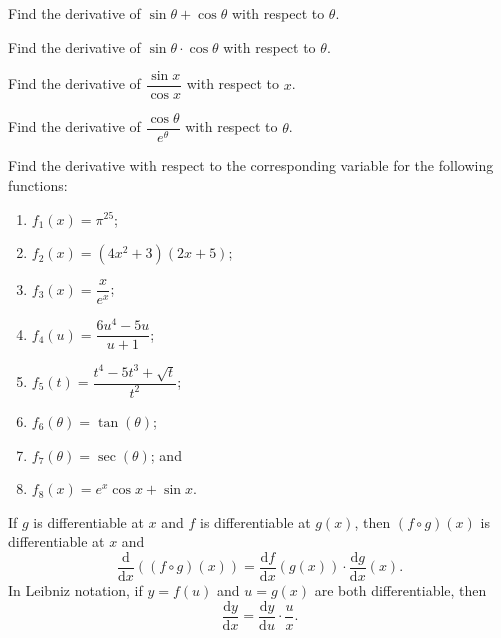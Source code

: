 \documentclass[11pt]{article}
\theoremstyle{break}
\newcommand{\differentiate}[1]{\dfrac{\dd}{\dd{#1}}}
\newcommand{\derivative}[2]{\dfrac{\dd{#1}}{\dd{#2}}}
\newcommand{\dd}{\text{d}}
\numberwithin{equation}{theorem}
\begin{document}
\begin{example}
    Find the derivative of $\sin\theta+\cos\theta$ with respect to $\theta$.
\end{example}
\vspace{8em}

\begin{example}
    Find the derivative of $\sin\theta\cdot\cos\theta$ with respect to $\theta$.
\end{example}
\vspace{8em}

\begin{example}
    Find the derivative of $\dfrac{\sin x}{\cos x}$ with respect to $x$.
\end{example}
\vspace{8em}

\begin{example}
    Find the derivative of $\dfrac{\cos\theta}{e^\theta}$ with respect to $\theta$.
\end{example}
\vspace{8em}

\newpage
\begin{question}
    Find the derivative with respect to the corresponding variable for the following functions:
    \begin{enumerate}
        \item $f_1(x)=\pi^{25}$;
        \item $f_2(x)=(4x^2+3)(2x+5)$;
        \item $f_3(x)=\dfrac{x}{e^x}$;
        \item $f_4(u)=\dfrac{6u^4-5u}{u+1}$;
        \item $f_5(t)=\dfrac{t^4-5t^3+\sqrt{t}}{t^2}$;
        \item $f_6(\theta)=\tan(\theta)$;
        \item $f_7(\theta)=\sec(\theta)$; and
        \item $f_8(x)=e^x\cos x+\sin x$.
    \end{enumerate}
\end{question}
\newpage

\begin{theorem}
    If $g$ is differentiable at $x$ and $f$ is differentiable at $g(x)$, then $(f\circ g)(x)$ is differentiable at $x$ and $$\differentiate{x}\left((f\circ g)(x)\right)=\derivative{f}{x}(g(x))\cdot\derivative{g}{x}(x).$$
    In Leibniz notation, if $y=f(u)$ and $u=g(x)$ are both differentiable, then $$\derivative{y}{x}=\derivative{y}{u}\cdot\dfrac{u}{x}.$$
\end{theorem}
\end{document}
